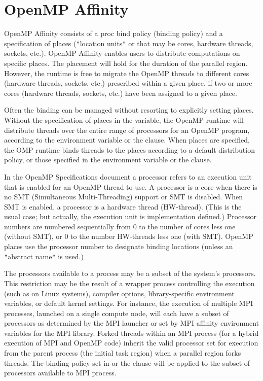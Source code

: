 \pagebreak
\chapter{OpenMP Affinity}
\label{chap:openmp_affinity}

OpenMP Affinity consists of a proc bind policy (binding policy) and a specification of
places (\texttt{"}location units\texttt{"} or  that may be cores, hardware
threads, sockets, etc.).  
OpenMP Affinity enables users to distribute computations on specific places.
The placement will hold for the duration of the parallel region. 
However, the runtime is free to migrate the OpenMP threads 
to different cores (hardware threads, sockets, etc.) prescribed within a given place, 
if two or more cores (hardware threads, sockets, etc.) have been assigned to a given place.

Often the binding can be managed without resorting to explicitly setting places.
Without the specification of places in the  variable, 
the OpenMP runtime will distribute threads over the entire range of processors for 
an OpenMP program, according to the  environment variable
or the  clause.  When places are specified, the OMP runtime
binds threads to the places according to a default distribution policy, or
those specified in the  environment variable or the
 clause.

In the OpenMP Specifications document a processor refers to an execution unit that
is enabled for an OpenMP thread to use.  A processor is a core when there is
no SMT (Simultaneous Multi-Threading) support or SMT is disabled.  When 
SMT is enabled, a processor is a hardware thread (HW-thread). (This is the
usual case; but actually, the execution unit is implementation defined.) Processor
numbers are numbered sequentially from 0 to the number of cores less one (without SMT), or
0 to the number HW-threads less one (with SMT). OpenMP places use the processor number to designate
binding locations (unless an \texttt{"}abstract name\texttt{"} is used.) 


The processors available to a process may be a subset of the system's
processors.  This restriction may be the result of a 
wrapper process controlling the execution (such as  on Linux systems), 
compiler options, library-specific environment variables, or default
kernel settings.  For instance, the execution of multiple MPI processes,
launched on a single compute node, will each have a subset of processors as
determined by the MPI launcher or set by MPI affinity environment 
variables for the MPI library.  Forked threads within an MPI process
(for a hybrid execution of MPI and OpenMP code) inherit the valid 
processor set for execution from the parent process (the initial task region) 
when a parallel region forks threads.  The binding policy set in 
 or the  clause will be applied to 
the subset of processors available to  MPI process.


